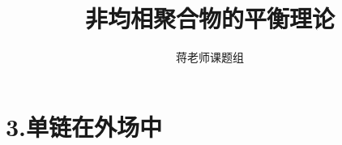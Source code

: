 \documentclass[12pt,a4paper]{article}
\title{非均相聚合物的平衡理论}
\author{蒋老师课题组}
\date{\chntoday}
\begin{document}
\maketitle
\section{3.单链在外场中}







\cite{tam19912d}

\end{document}

